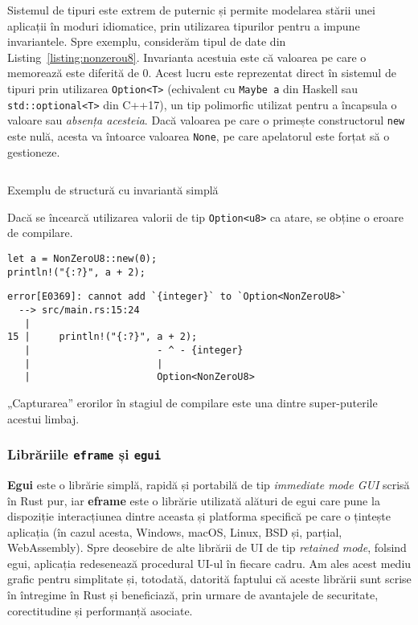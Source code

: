 \documentclass[a4paper]{article}
\begin{document}
Sistemul de tipuri este extrem de puternic și permite modelarea stării unei aplicații în moduri idiomatice, prin utilizarea tipurilor
pentru a impune invariantele. Spre exemplu, considerăm tipul de date din Listing~\ref{listing:nonzerou8}. Invarianta acestuia este
că valoarea pe care o memorează este diferită de $0$. Acest lucru este reprezentat direct în sistemul de tipuri prin utilizarea
\texttt{Option<T>} (echivalent cu \texttt{Maybe a} din Haskell sau \texttt{std::optional<T>} din C++17), un tip polimorfic utilizat
pentru a încapsula o valoare sau \textit{absența acesteia}. Dacă valoarea pe care o primește constructorul \texttt{new} este nulă,
acesta va întoarce valoarea \texttt{None}, pe care apelatorul este forțat să o gestioneze.

\begin{listing}
  \inputminted{rust}{codeblocks/nonzerou8.rs}
  \caption{Exemplu de structură cu invariantă simplă}
  \label{listing:nonzerou8}
\end{listing}

Dacă se încearcă utilizarea valorii de tip \texttt{Option<u8>} ca atare, se obține o eroare de compilare.

\begin{verbatim}
let a = NonZeroU8::new(0);
println!("{:?}", a + 2);
\end{verbatim}
\begin{verbatim}
error[E0369]: cannot add `{integer}` to `Option<NonZeroU8>`
  --> src/main.rs:15:24
   |
15 |     println!("{:?}", a + 2);
   |                      - ^ - {integer}
   |                      |
   |                      Option<NonZeroU8>
\end{verbatim}

„Capturarea” erorilor în stagiul de compilare este una dintre super-puterile acestui limbaj.

\subsubsection{Librăriile \texttt{eframe} și \texttt{egui}}
\textbf{Egui} este o librărie simplă, rapidă și portabilă de tip \textit{immediate mode GUI} scrisă în Rust pur\cite{egui}, iar
\textbf{eframe} este o librărie utilizată alături de egui care pune la dispoziție interacțiunea dintre aceasta și platforma specifică
pe care o țintește aplicația (în cazul acesta, Windows, macOS, Linux, BSD și, parțial, WebAssembly). Spre deosebire de alte librării
de UI de tip \textit{retained mode}, folsind egui, aplicația redesenează procedural UI-ul în fiecare cadru. Am ales acest mediu
grafic pentru simplitate și, totodată, datorită faptului că aceste librării sunt scrise în întregime în Rust și beneficiază, prin urmare
de avantajele de securitate, corectitudine și performanță asociate.
\end{document}
